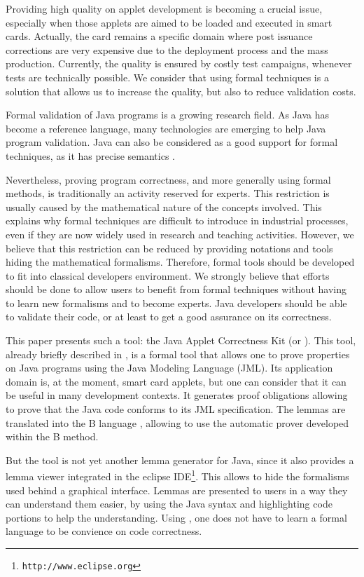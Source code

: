  Providing high quality on applet development is becoming a crucial
issue, especially when those applets are aimed to be loaded and executed in smart cards.  Actually, the card
remains a specific domain where post issuance corrections are very expensive due to the deployment process and
the mass production. Currently, the quality is ensured by costly test campaigns, whenever tests are technically
possible. We consider that using formal techniques is a solution that allows us to increase the quality, but
also to reduce validation costs.

 Formal validation of Java programs is a growing research
 field.  As Java has become a reference language, many technologies are
 emerging to help Java program validation.  Java can also be
 considered as a good support for formal techniques, as it has precise semantics \cite{Gosl00a}.

 Nevertheless, proving program correctness, and more generally using
formal methods, is traditionally an activity reserved for experts.  This restriction is usually caused by the
mathematical nature of the concepts involved.  This explains why formal techniques are difficult to introduce in
industrial processes, even if they are now widely used in research and teaching activities.  However, we believe
that this restriction can be reduced by providing notations and tools hiding the mathematical formalisms.
Therefore, formal tools should be developed to fit into classical developers environment.  We strongly believe
that efforts should be done to allow users to benefit from formal techniques without having to learn new
formalisms and to become experts. Java developers should be able to validate their code, or at least to get a
good assurance on its correctness.

 This paper presents such a tool: the Java Applet Correctness Kit
 (or \JACK).  This tool, already briefly described in
 \cite{BR-gdc2002}, is a formal tool that allows one to prove properties on
 Java programs using the Java Modeling Language \cite{LBR00} (JML).
 Its application domain is, at the moment, smart card applets, but one can consider that it can be useful in
many development contexts.
 It generates proof obligations
 allowing to prove that the Java code conforms to its JML
 specification.  The lemmas are translated into the B language \cite{bbook},
 allowing to use the automatic prover developed within the B method.

 But the tool is not yet another lemma generator for Java, since it also provides a lemma
 viewer integrated in the eclipse
 IDE\footnote{\texttt{http://www.eclipse.org}}.  This allows to
 hide the formalisms used behind a graphical interface.  Lemmas are
 presented to users in a way they can understand them easier, by using the Java syntax and highlighting code portions to help
 the understanding. Using \JACK, one does not have to learn a formal language to be convience on
code correctness.

